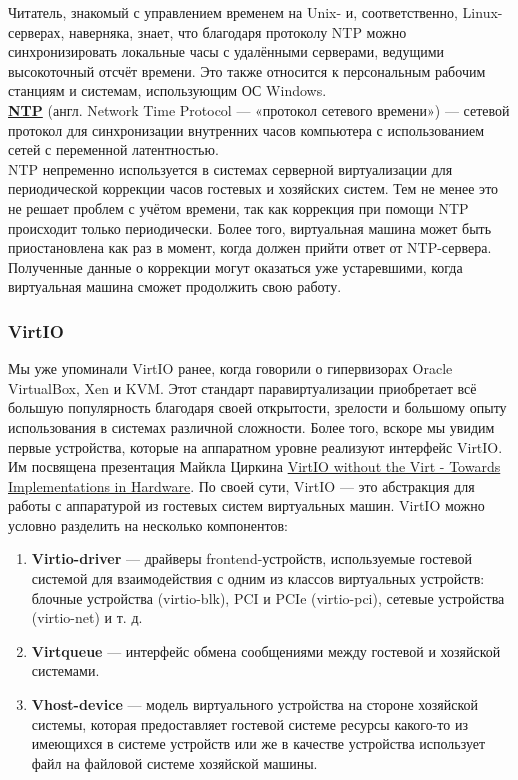 \documentclass[14pt, a4paper]{article}
\begin{document}
Читатель, знакомый с управлением временем на Unix- и, соответственно, Linux-серверах, наверняка,
знает, что благодаря протоколу NTP можно синхронизировать локальные часы с удалёнными
серверами, ведущими высокоточный отсчёт времени. Это также относится к персональным рабочим
станциям и системам, использующим ОС Windows.\\

\href{https://ru.wikipedia.org/wiki/NTP}{\textbf{NTP}} (англ. Network Time Protocol — «протокол сетевого времени») — сетевой протокол для
синхронизации внутренних часов компьютера с использованием сетей с переменной латентностью.\\

NTP непременно используется в системах серверной виртуализации для периодической коррекции
часов гостевых и хозяйских систем. Тем не менее это не решает проблем с учётом времени, так как
коррекция при помощи NTP происходит только периодически. Более того, виртуальная машина может
быть приостановлена как раз в момент, когда должен прийти ответ от NTP-сервера. Полученные
данные о коррекции могут оказаться уже устаревшими, когда виртуальная машина сможет
продолжить свою работу.

\subsubsection*{VirtIO} 

Мы уже упоминали VirtIO ранее, когда говорили о гипервизорах Oracle VirtualBox, Xen и KVM. Этот
стандарт паравиртуализации приобретает всё большую популярность благодаря своей открытости,
зрелости и большому опыту использования в системах различной сложности. Более того, вскоре мы
увидим первые устройства, которые на аппаратном уровне реализуют интерфейс VirtIO. Им
посвящена презентация Майкла Циркина 
\href{https://static.sched.com/hosted_files/osseu19/cd/virtio-without-the-virt-2019-final.odp}{VirtIO without the Virt - Towards Implementations in Hardware}.
По своей сути, VirtIO — это абстракция для работы с аппаратурой из гостевых систем виртуальных
машин. VirtIO можно условно разделить на несколько компонентов:

\begin{enumerate}
    \item \textbf{Virtio-driver} — драйверы frontend-устройств, используемые гостевой системой для
    взаимодействия с одним из классов виртуальных устройств: блочные устройства (virtio-blk),
    PCI и PCIe (virtio-pci), сетевые устройства (virtio-net) и т. д.
    \item \textbf{Virtqueue} — интерфейс обмена сообщениями между гостевой и хозяйской системами.
    \item \textbf{Vhost-device} — модель виртуального устройства на стороне хозяйской системы, которая
    предоставляет гостевой системе ресурсы какого-то из имеющихся в системе устройств или же
    в качестве устройства использует файл на файловой системе хозяйской машины.
\end{enumerate}
\end{document}
